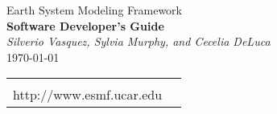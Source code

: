 \documentclass[english,dvips]{article}
\begin{document}

\begin{titlepage}

\begin{center}
{\Large    Earth System Modeling Framework } \\
{\Large {\bf  Software Developer's Guide}} \\
\medskip
{\it Silverio Vasquez, Sylvia Murphy, and Cecelia DeLuca} \\
\vspace{.5in}
{\large \today}
\end{center}

\begin{latexonly}
\vspace{6in}
\begin{tabular}{p{5in}p{.9in}}
\hrulefill \\
\noindent http://www.esmf.ucar.edu \\
\end{tabular}
\end{latexonly}

\end{titlepage}

\tableofcontents

\newpage












\end{document}
